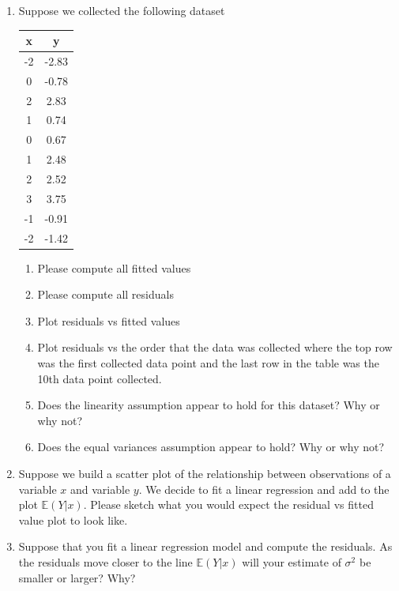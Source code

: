 \begin{enumerate}
    \item Suppose we collected the following dataset
    \begin{table}[ht!]
        \centering
        \begin{tabular}{c|c}
            x & y \\
            \hline
            -2  & -2.83  \\ 
            0   &  -0.78 \\ 
            2   &  2.83  \\ 
            1   &  0.74  \\ 
            0   &  0.67  \\ 
            1   &  2.48  \\ 
            2   &  2.52  \\ 
            3   &  3.75  \\ 
            -1  &  -0.91 \\ 
            -2  &  -1.42 \\ 
        \end{tabular}
    \end{table}
    \begin{enumerate}
        \item Please compute all fitted values
        \item Please compute all residuals
        \item Plot residuals vs fitted values
        \item Plot residuals vs the order that the data was collected where the top row was the first collected data point and the last row in the table was the 10th data point collected. 
        \item Does the linearity assumption appear to hold for this dataset? Why or why not?
        \item Does the equal variances assumption appear to hold? Why or why not?
    \end{enumerate}
    
    
    
    \item Suppose we build a scatter plot of the relationship between observations of a variable $x$ and variable $y$. 
    We decide to fit a linear regression and add to the plot $\mathbb{E}(Y|x)$. 
    Please sketch what you would expect the residual vs fitted value plot to look like.
    
    \item Suppose that you fit a linear regression model and compute the residuals.
    As the residuals move closer to the line $\mathbb{E}(Y|x)$ will your estimate of $\sigma^{2}$ be smaller or larger? Why?  
    

\end{enumerate}
